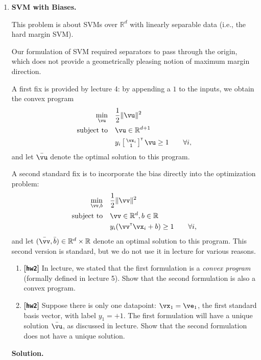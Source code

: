 \documentclass{article}
\newcommand\T{{\scriptscriptstyle\mathsf{T}}}
\def\R{\mathbb{R}}
\def\1{\mathds{1}}
\def\hw{\textbf{[\texttt{hw2}]}\xspace}
\theoremstyle{definition}
\theoremstyle{remark}
\newenvironment{Q}
{%
\clearpage
\item
}
{%
\phantom{s}%
\bigskip%
\noindent\textbf{Solution.}
}
\begin{document}
\begin{enumerate}[font={\Large\bfseries},leftmargin=0pt]

\begin{Q}
  \textbf{\Large{}SVM with Biases.}

  This problem is about SVMs over $\R^d$ with linearly separable data
  (i.e., the hard margin SVM).

  Our formulation of SVM required separators to pass through the origin, which 
  does not provide a geometrically pleasing notion of maximum margin direction.

  A first fix is provided by lecture 4: by appending a $1$ to the inputs,
  we obtain the convex program
  \begin{align*}
    \min_{\vu}\quad&\frac 1 2 \|\vu\|^2\\
    \textrm{subject to}\quad&\vu\in\R^{d+1}\\
                            &y_i \sbr[1]{\begin{smallmatrix}\vx_i\\1\end{smallmatrix}}^\T \vu
                            \geq 1\qquad\forall i,
  \end{align*}
  and let $\bar\vu$ denote the optimal solution to this program.

  A second standard fix is to incorporate the bias directly into the optimization problem:
  \begin{align*}
    \min_{\vv,b}\quad&\frac 1 2 \|\vv\|^2\\
    \textrm{subject to}\quad&\vv\in\R^{d}, b\in\R\\
                            &y_i (\vv^\T \vx_i + b) \geq 1\qquad\forall i,
  \end{align*}
  and let $(\bar\vv,\bar b) \in \R^d \times \R$ denote an optimal solution to this program.
  This second version is standard, but we do not use it in lecture for various reasons.

  \begin{enumerate}
    \item 
      \hw In lecture, we stated that the first formulation is a \emph{convex program}
      (formally defined in lecture 5).
      Show that the second formulation is also a convex program.

    \item
      \hw Suppose there is only one datapoint: $\vx_1 = \ve_1$, the first standard basis vector, 
      with label $y_1 = +1$.
      The first formulation will have a unique solution $\bar\vu$, as discussed in lecture.
      Show that the second formulation does not have a unique solution.


\end{enumerate}
\end{Q}
\end{enumerate}
\end{document}
